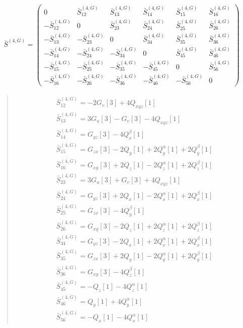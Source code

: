 \documentclass[fleqn,10pt]{jsarticle}
\begin{document}
\begin{align*}
\bar{S}^{(4,G)} = \begin{pmatrix} 0 & \bar{S}^{(4,G)}_{12} & \bar{S}^{(4,G)}_{13} & \bar{S}^{(4,G)}_{14} & \bar{S}^{(4,G)}_{15} & \bar{S}^{(4,G)}_{16} \\ - \bar{S}^{(4,G)}_{12} & 0 & \bar{S}^{(4,G)}_{23} & \bar{S}^{(4,G)}_{24} & \bar{S}^{(4,G)}_{25} & \bar{S}^{(4,G)}_{26} \\ - \bar{S}^{(4,G)}_{13} & - \bar{S}^{(4,G)}_{23} & 0 & \bar{S}^{(4,G)}_{34} & \bar{S}^{(4,G)}_{35} & \bar{S}^{(4,G)}_{36} \\ - \bar{S}^{(4,G)}_{14} & - \bar{S}^{(4,G)}_{24} & - \bar{S}^{(4,G)}_{34} & 0 & \bar{S}^{(4,G)}_{45} & \bar{S}^{(4,G)}_{46} \\ - \bar{S}^{(4,G)}_{15} & - \bar{S}^{(4,G)}_{25} & - \bar{S}^{(4,G)}_{35} & - \bar{S}^{(4,G)}_{45} & 0 & \bar{S}^{(4,G)}_{56} \\ - \bar{S}^{(4,G)}_{16} & - \bar{S}^{(4,G)}_{26} & - \bar{S}^{(4,G)}_{36} & - \bar{S}^{(4,G)}_{46} & - \bar{S}^{(4,G)}_{56} & 0 \end{pmatrix}
\end{align*}
\begin{quote}
\begin{align*}
& \bar{S}^{(4,G)}_{12} = - 2 G_{v}[3] + 4 Q_{xyz}[1] \\
& \bar{S}^{(4,G)}_{13} = 3 G_{u}[3] - G_{v}[3] - 4 Q_{xyz}[1] \\
& \bar{S}^{(4,G)}_{14} = G_{yz}[3] - 4 Q_{x}^{\beta}[1] \\
& \bar{S}^{(4,G)}_{15} = G_{zx}[3] - 2 Q_{y}[1] + 2 Q_{y}^{\alpha}[1] + 2 Q_{y}^{\beta}[1] \\
& \bar{S}^{(4,G)}_{16} = G_{xy}[3] + 2 Q_{z}[1] - 2 Q_{z}^{\alpha}[1] + 2 Q_{z}^{\beta}[1] \\
& \bar{S}^{(4,G)}_{23} = 3 G_{u}[3] + G_{v}[3] + 4 Q_{xyz}[1] \\
& \bar{S}^{(4,G)}_{24} = G_{yz}[3] + 2 Q_{x}[1] - 2 Q_{x}^{\alpha}[1] + 2 Q_{x}^{\beta}[1] \\
& \bar{S}^{(4,G)}_{25} = G_{zx}[3] - 4 Q_{y}^{\beta}[1] \\
& \bar{S}^{(4,G)}_{26} = G_{xy}[3] - 2 Q_{z}[1] + 2 Q_{z}^{\alpha}[1] + 2 Q_{z}^{\beta}[1] \\
& \bar{S}^{(4,G)}_{34} = G_{yz}[3] - 2 Q_{x}[1] + 2 Q_{x}^{\alpha}[1] + 2 Q_{x}^{\beta}[1] \\
& \bar{S}^{(4,G)}_{35} = G_{zx}[3] + 2 Q_{y}[1] - 2 Q_{y}^{\alpha}[1] + 2 Q_{y}^{\beta}[1] \\
& \bar{S}^{(4,G)}_{36} = G_{xy}[3] - 4 Q_{z}^{\beta}[1] \\
& \bar{S}^{(4,G)}_{45} = - Q_{z}[1] - 4 Q_{z}^{\alpha}[1] \\
& \bar{S}^{(4,G)}_{46} = Q_{y}[1] + 4 Q_{y}^{\alpha}[1] \\
& \bar{S}^{(4,G)}_{56} = - Q_{x}[1] - 4 Q_{x}^{\alpha}[1]
\end{align*}
\end{quote}
\end{document}
